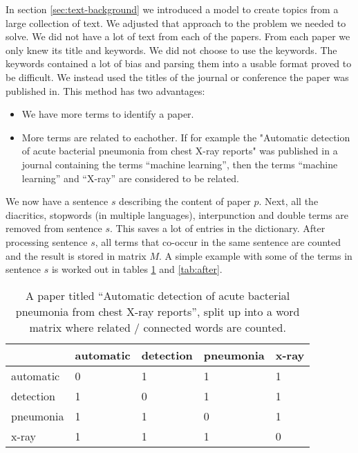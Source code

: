 
In section \ref{sec:text-background} we introduced a model to create topics from a large collection of text. We adjusted that approach to the problem we needed to solve. We did not have a lot of text from each of the papers. From each paper we only knew its title and keywords.
We did not choose to use the keywords.
The keywords contained a lot of bias and parsing them into a usable format proved to be difficult.
We instead used the titles of the journal or conference the paper was published in.
This method has two advantages:

\begin{itemize}
\item[1] We have more terms to identify a paper.
\item[2] More terms are related to eachother. If for example the "Automatic detection of acute bacterial pneumonia from chest X-ray reports" was published in a journal containing the terms ``machine learning'', then the terms ``machine learning'' and ``X-ray'' are considered to be related. 
\end{itemize}

We now have a sentence $s$ describing the content of paper $p$.
Next, all the diacritics, stopwords (in multiple languages), interpunction and double terms are removed from sentence $s$.
This saves a lot of entries in the dictionary\cite{chowdhury2010introduction}.
After processing sentence $s$, all terms that co-occur in the same sentence are counted and the result is stored in matrix $M$.
A simple example with some of the terms in sentence $s$ is worked out in tables \ref{tab:before} and \ref{tab:after}.

\begin{table}
	\begin{center}
	

\begin{tabular}{|l|l|l|l|l|}
\hline
	 	& automatic  & detection & pneumonia &  x-ray \\ \hline
automatic 	&	0 	& 	1 &	 1 &  1	 \\ \hline
detection	&	1	&	0 &	 1 &  1	 \\ \hline
pneumonia	&	1	&	1 &	 0 &  1	 \\ \hline
x-ray		&	1	&	1 &	 1 &  0	 \\ \hline

\end{tabular} 
	\end{center}
	\caption{A paper titled ``Automatic detection of acute bacterial pneumonia from chest X-ray reports'', split up into a word matrix where related / connected words are counted.}
	\label{tab:before}
\end{table}


